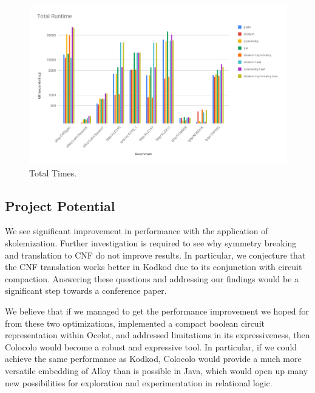 \documentclass[10pt]{article}
\theoremstyle{definition}
\begin{document}
    \begin{figure}[h]
      \includegraphics[width=\textwidth]{total.pdf}
      \caption{Total Times.}
      \label{fig:total}
    \end{figure}


    \subsection{Project Potential}

    We see significant improvement in performance with the application of skolemization. Further investigation is required to see why symmetry breaking and translation to CNF do not improve results. In particular, we conjecture that the CNF translation works better in Kodkod due to its conjunction with circuit compaction. Answering these questions and addressing our findings would be a significant step towards a conference paper.

    We believe that if we managed to get the performance improvement we hoped for from these two optimizations, implemented a compact boolean circuit representation within Ocelot, and addressed limitations in its expressiveness, then Colocolo would become a robust and expressive tool. In particular, if we could achieve the same performance as Kodkod, Colocolo would provide a much more versatile embedding of Alloy than is possible in Java, which would open up many new possibilities for exploration and experimentation in relational logic.
\end{document}
